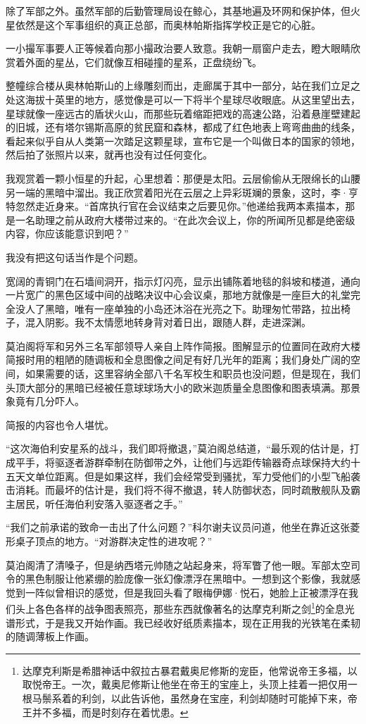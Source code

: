 \documentclass[AutoFakeBold=true]{book}
\begin{document}
除了军部之外。虽然军部的后勤管理局设在鲸心，其基地遍及环网和保护体，但火星依然是这个军事组织的真正总部，而奥林帕斯指挥学校正是它的心脏。

一小撮军事要人正等候着向那小撮政治要人致意。我朝一扇窗户走去，瞪大眼睛欣赏着外面的星丛，它们就像互相碰撞的星系，正盘绕纷飞。

整幢综合楼从奥林帕斯山的上缘雕刻而出，走廊属于其中一部分，站在我们立足之处这海拔十英里的地方，感觉像是可以一下将半个星球尽收眼底。从这里望出去，星球就像一座远古的盾状火山，而那些玩着缩距把戏的高速公路，沿着悬崖壁建起的旧城，还有塔尔锡斯高原的贫民窟和森林，都成了红色地表上弯弯曲曲的线条，看起来似乎自从人类第一次踏足这颗星球，宣布它是一个叫做日本的国家的领地，然后拍了张照片以来，就再也没有过任何变化。

我观赏着一颗小恒星的升起，心里想着：那便是{\kaishu 太阳}。云层偷偷从无限绵长的山腰另一端的黑暗中溜出。我正欣赏着阳光在云层之上异彩斑斓的景象，这时，李·亨特忽然走近身来。``首席执行官在会议结束之后要见你。''他递给我两本素描本，那是一名助理之前从政府大楼带过来的。``在此次会议上，你的所闻所见都是绝密级内容，你应该能意识到吧？''

我没有把这句话当作是个问题。

宽阔的青铜门在石墙间洞开，指示灯闪亮，显示出铺陈着地毯的斜坡和楼道，通向一片宽广的黑色区域中间的战略决议中心会议桌，那地方就像是一座巨大的礼堂完全没人了黑暗，唯有一座单独的小岛还沐浴在光亮之下。助理匆忙带路，拉出椅子，混入阴影。我不太情愿地转身背对着日出，跟随人群，走进深渊。

\vspace*{1em}

莫泊阁将军和另外三名军部领导人亲自上阵作简报。图解显示的位置同在政府大楼简报时用的粗陋的随调板和全息图像之间足有好几光年的距离；我们身处广阔的空间，如果需要的话，这里容纳全部八千名军校生和职员也没问题，但是现在，我们头顶大部分的黑暗已经被任意球球场大小的欧米迦质量全息图像和图表填满。那景象竟有几分吓人。

简报的内容也令人堪忧。

``这次海伯利安星系的战斗，我们即将撤退，''莫泊阁总结道，``最乐观的估计是，打成平手，将驱逐者游群牵制在防御带之外，让他们与远距传输器奇点球保持大约十五天文单位距离。但是如果这样，我们会经常受到骚扰，军力受他们的小型飞船袭击消耗。而最坏的估计是，我们将不得不撤退，转人防御状态，同时疏散舰队及霸主居民，听任海伯利安落入驱逐者之手。''

``我们之前承诺的致命一击出了什么问题？''科尔谢夫议员问道，他坐在靠近这张菱形桌子顶点的地方。``对游群决定性的进攻呢？''

莫泊阁清了清嗓子，但是纳西塔元帅随之站起身来，将军瞥了他一眼。军部太空司令的黑色制服让他紧绷的脸庞像一张幻像漂浮在黑暗中。一想到这个影像，我就感觉到一阵{\kaishu 似曾相识}的感觉，但是我回头看了眼梅伊娜·悦石，她脸上正被漂浮在我们头上各色各样的战争图表照亮，那些东西就像著名的达摩克利斯之剑\footnote{达摩克利斯是希腊神话中叙拉古暴君戴奥尼修斯的宠臣，他常说帝王多福，以取悦帝王。一次，戴奥尼修斯让他坐在帝王的宝座上，头顶上挂着一把仅用一根马鬃系着的利剑，以此告诉他，虽然身在宝座，利剑却随时可能掉下来，帝王并不多福，而是时刻存在着忧患。}的全息光谱形式，于是我又开始作画。我已经收好纸质素描本，现在正用我的光铁笔在柔韧的随调薄板上作画。
\end{document}
